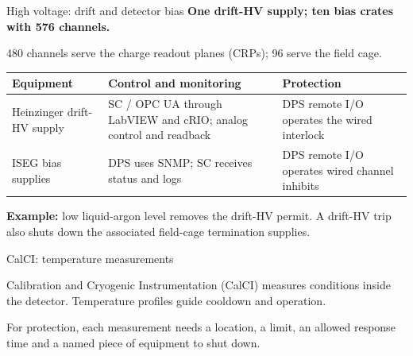 \documentclass[aspectratio=169,11pt]{beamer}
\begin{document}
\begin{frame}{High voltage: drift and detector bias}
\textbf{One drift-HV supply; ten bias crates with 576 channels.}\par
480 channels serve the charge readout planes (CRPs); 96 serve the field cage.\par\bigskip
\renewcommand{\arraystretch}{1.35}
\begin{tabularx}{\textwidth}{@{}>{\RaggedRight\arraybackslash}p{2.1cm}>{\RaggedRight\arraybackslash}X>{\RaggedRight\arraybackslash}X@{}}
\toprule
\textbf{Equipment} & \textbf{Control and monitoring} & \textbf{Protection}\\\midrule
Heinzinger drift-HV supply & SC / OPC UA through LabVIEW and cRIO; analog control and readback & DPS remote I/O operates the wired interlock\\
ISEG bias supplies & DPS uses SNMP; SC receives status and logs & DPS remote I/O operates wired channel inhibits\\
\bottomrule
\end{tabularx}\par\bigskip
\textbf{Example:} low liquid-argon level removes the drift-HV permit. A drift-HV trip also shuts down the associated field-cage termination supplies.
\end{frame}

\begin{frame}{CalCI: temperature measurements}
\centering
{}\par\bigskip
\raggedright

Calibration and Cryogenic Instrumentation (CalCI) measures conditions inside the detector. Temperature profiles guide cooldown and operation.\par\bigskip
For protection, each measurement needs a location, a limit, an allowed response time and a named piece of equipment to shut down.
\end{frame}
\end{document}
